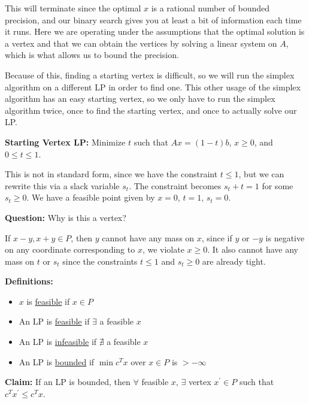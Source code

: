 \documentclass[11pt]{article}
\begin{document}
This will terminate since the optimal $x$ is a rational number of bounded precision, and our binary search gives you at least a bit of information each time it runs. Here we are operating under the assumptions that the optimal solution is a vertex and that we can obtain the vertices by solving a linear system on $A$, which is what allows us to bound the precision.

Because of this, finding a starting vertex is difficult, so we will run the simplex algorithm on a different LP in order to find one. This other usage of the simplex algorithm has an easy starting vertex, so we only have to run the simplex algorithm twice, once to find the starting vertex, and once to actually solve our LP.

{\bf Starting Vertex LP:} Minimize $t$ such that $Ax=(1-t)b$, $x \ge 0$, and $0\le t \le 1$.

This is not in standard form, since we have the constraint $t\le 1$, but we can rewrite this via a slack variable $s_t$. The constraint becomes $s_t+t=1$ for some $s_t\ge 0$. We have a feasible point given by $x=0$, $t=1$, $s_t=0$.

{\bf Question:} Why is this a vertex?

If $x-y,x+y\in P$, then $y$ cannot have any mass on $x$, since if $y$ or $-y$ is negative on any coordinate corresponding to $x$, we violate $x\ge 0$. It also cannot have any mass on $t$ or $s_t$ since the constraints $t\le 1$ and $s_t\ge 0$ are already tight.

{\bf Definitions:}
\begin{itemize}
\item{$x$ is \underline{feasible} if $x\in P$}
\item{An LP is \underline{feasible} if $\exists$ a feasible $x$}
\item{An LP is \underline{infeasible} if $\nexists$ a feasible $x$}
\item{An LP is \underline{bounded} if $\min c^Tx$ over $x\in P$ is $>-\infty$}
\end{itemize}

{\bf Claim:} If an LP is bounded, then $\forall$ feasible $x$, $\exists$ vertex $x^{\prime}\in P$ such that $c^Tx^{\prime}\le c^Tx$.
\end{document}
